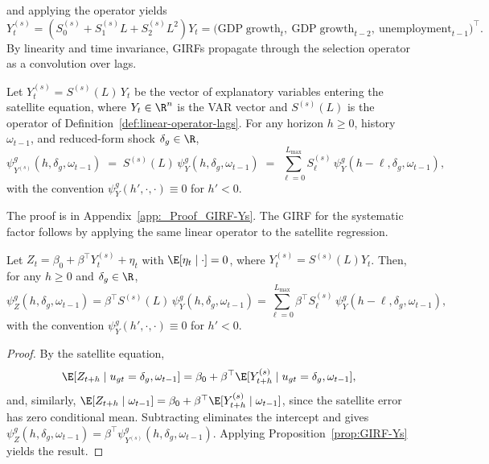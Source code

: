 and applying the operator yields
\begin{equation}
    Y_t^{(s)}
    = \left( S^{(s)}_{0} + S^{(s)}_{1}L + S^{(s)}_{2}L^2 \right) Y_t
    = \big(\mathrm{GDP\;growth}_{t},\ \mathrm{GDP\;growth}_{t-2},\ \mathrm{unemployment}_{t-1}\big)^\top.
\end{equation}
\medskip
By linearity and time invariance, GIRFs propagate through the selection operator
as a convolution over lags.
\begin{prop}
    \label{prop:GIRF-Ys}
    Let $Y_t^{(s)} = S^{(s)}(L)\,Y_t$ be the vector of explanatory variables
    entering the satellite equation, where $Y_t\in\R^{n}$ is the VAR vector
    and $S^{(s)}(L)$ is the operator of
    Definition~\ref{def:linear-operator-lags}. For any horizon $h\ge0$,
    history $\omega_{t-1}$, and reduced-form shock $\delta_g\in\R$,
    \begin{equation}
    \label{eq:GIRF-Ys-operator}
        \psi^g_{Y^{(s)}}(h,\delta_g,\omega_{t-1})
        \;=\; S^{(s)}(L)\,\psi^g_{Y}(h,\delta_g,\omega_{t-1})
        \;=\; \sum_{\ell=0}^{L_{\max}} S^{(s)}_\ell\,\psi^g_{Y}(h-\ell,\delta_g,\omega_{t-1}),
    \end{equation}
    with the convention $\psi^g_{Y}(h',\cdot,\cdot)\equiv 0$ for $h'<0$.
\end{prop}
The proof is in Appendix~\ref{app:_Proof_GIRF-Ys}. The GIRF for the systematic
factor follows by applying the same linear operator to the satellite regression.
\begin{prop}
    \label{prop:GIRF-Z}
    Let $Z_t = \beta_0 + \beta^\top Y_t^{(s)} + \eta_t$ with
    $\E[\eta_t \mid \cdot] = 0$, where $Y_t^{(s)} = S^{(s)}(L)Y_t$. Then,
    for any $h \ge 0$ and $\delta_g \in \R$,
    \begin{equation}
        \psi^g_Z(h,\delta_g,\omega_{t-1})
        =
        \beta^\top S^{(s)}(L)\,
        \psi^g_{Y}(h,\delta_g,\omega_{t-1})
        =
        \sum_{\ell=0}^{L_{\max}}
        \beta^\top S^{(s)}_\ell\,
        \psi^g_{Y}(h-\ell,\delta_g,\omega_{t-1}),
    \end{equation}
    with the convention $\psi^g_{Y}(h',\cdot,\cdot)\equiv 0$ for $h'<0$.
\end{prop}
\begin{proof}
By the satellite equation,
\[
\E[Z_{t+h}\mid u_{gt}=\delta_g,\omega_{t-1}]
= \beta_0 + \beta^\top \E[Y^{(s)}_{t+h}\mid u_{gt}=\delta_g,\omega_{t-1}],
\]
and, similarly,
$\E[Z_{t+h}\mid \omega_{t-1}] = \beta_0 + \beta^\top \E[Y^{(s)}_{t+h}\mid \omega_{t-1}]$,
since the satellite error has zero conditional mean. Subtracting eliminates
the intercept and gives
$\psi^g_Z(h,\delta_g,\omega_{t-1}) = \beta^\top \psi^g_{Y^{(s)}}(h,\delta_g,\omega_{t-1})$.
Applying Proposition~\ref{prop:GIRF-Ys} yields the result.
\end{proof}
